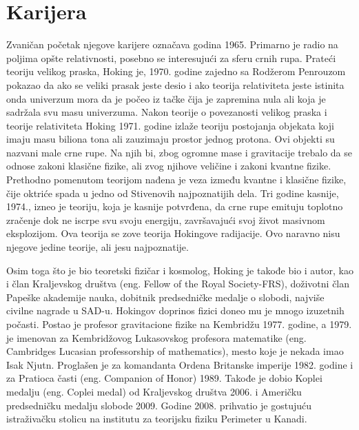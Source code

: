 \documentclass[a4paper, 12pt]{article}
\begin{document}
{\section{Karijera}
Zvaničan početak njegove karijere označava godina 1965. Primarno je radio na poljima opšte 
relativnosti, posebno se interesujući za sferu crnih rupa. Prateći teoriju velikog 
praska, Hoking je, 1970. godine zajedno sa Rodžerom Penrouzom pokazao da ako se veliki 
prasak jeste desio i ako teorija relativiteta jeste istinita onda univerzum mora da je 
počeo iz tačke čija je zapremina nula ali koja je sadržala svu masu univerzuma. \cite{famousscientists}
Nakon teorije o povezanosti velikog praska i teorije relativiteta Hoking 
1971. godine izlaže teoriju postojanja objekata koji imaju masu biliona 
tona ali zauzimaju prostor jednog protona. Ovi objekti su nazvani male crne rupe. 
Na njih bi, zbog ogromne mase i gravitacije trebalo da se odnose zakoni klasične fizike, 
ali zvog njihove veličine i zakoni kvantne fizike. Prethodno pomenutom teorijom nađena je 
veza između kvantne i klasične fizike, čije oktriće spada u jedno od Stivenovih 
najpoznatijih dela. Tri godine kasnije, 1974., izneo je teoriju, koja je kasnije 
potvrđena, da crne rupe emituju toplotno zračenje dok ne iscrpe svu svoju energiju, 
završavajući svoj život masivnom eksplozijom. Ova teorija se zove teorija Hokingove radijacije. 
Ovo naravno nisu njegove jedine teorije, ali jesu najpoznatije. \midskip \cite{britishphysicists}

Osim toga što je bio teoretski fizičar i kosmolog, Hoking je takođe bio i autor, 
kao i član Kraljevskog društva (eng. Fellow of the Royal Society-FRS), doživotni član Papeške akademije nauka, dobitnik 
predsedničke medalje o slobodi, najviše civilne nagrade u SAD-u. Hokingov doprinos 
fizici doneo mu je mnogo izuzetnih počasti. Postao je profesor gravitacione fizike na 
Kembridžu 1977. godine, a 1979. je imenovan za Kembridžovog Lukasovskog profesora 
matematike (eng. Cambridges Lucasian professorship of mathematics), mesto koje je 
nekada imao Isak Njutn. Proglašen je za komandanta Ordena Britanske imperije 1982. 
godine i za Pratioca časti (eng. Companion of Honor) 1989. Takođe je dobio Koplei 
medalju (eng. Coplei medal) od Kraljevskog društva 2006. i Američku predsedničku 
medalju slobode 2009. Godine 2008. prihvatio je gostujuću istraživačku stolicu na 
institutu za teorijsku fiziku Perimeter u Kanadi. \cite{britishphysicists}

}
\end{document}
